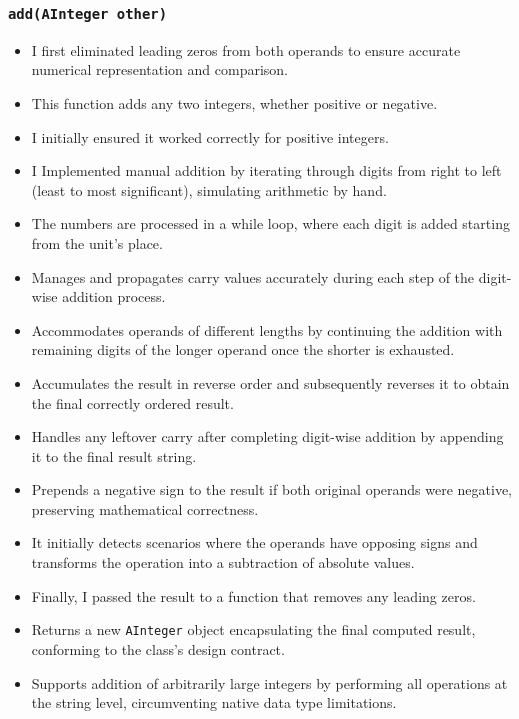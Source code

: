 \documentclass{article}
\begin{document}
\subsubsection*{\texttt{add(AInteger other)}}
\begin{itemize}
    \item I first eliminated leading zeros from both operands to ensure accurate numerical representation and comparison.
    \item This function adds any two integers, whether positive or negative.
    \item I initially ensured it worked correctly for positive integers.
    \item I Implemented manual addition by iterating through digits from right to left (least to most significant), simulating arithmetic by hand.
    \item The numbers are processed in a while loop, where each digit is added starting from the unit's place.
    \item Manages and propagates carry values accurately during each step of the digit-wise addition process.
    \item Accommodates operands of different lengths by continuing the addition with remaining digits of the longer operand once the shorter is exhausted.
    \item Accumulates the result in reverse order and subsequently reverses it to obtain the final correctly ordered result.
    \item Handles any leftover carry after completing digit-wise addition by appending it to the final result string.
    \item Prepends a negative sign to the result if both original operands were negative, preserving mathematical correctness.
    \item It initially detects scenarios where the operands have opposing signs and transforms the operation into a subtraction of absolute values.
    \item Finally, I passed the result to a function that removes any leading zeros.
    \item Returns a new \texttt{AInteger} object encapsulating the final computed result, conforming to the class's design contract.
    \item Supports addition of arbitrarily large integers by performing all operations at the string level, circumventing native data type limitations.
\end{itemize}
\end{document}
